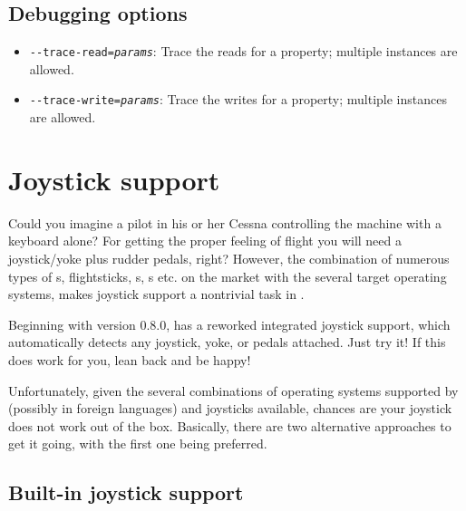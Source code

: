 \subsection{Debugging options}
\begin{itemize}
\item{\texttt{-$ $-trace-read={\it params}}}: Trace the reads for a property; multiple instances are allowed.
\item{\texttt{-$ $-trace-write={\it params}}}: Trace the writes for a property; multiple instances are allowed.
\end{itemize}



\section{Joystick support\label{joysticksupp}}
Could you imagine a pilot in his or her Cessna controlling the machine with
a keyboard alone? For getting the proper feeling of flight you will need a
joystick/yoke plus rudder pedals, right? However, the combination of
numerous types of s, flightsticks, s,
s etc. on the market with the several target operating systems,
makes joystick support a nontrivial task in \FlightGear{}$\!$.

Beginning with version 0.8.0, \FlightGear{} has a reworked integrated
joystick support, which automatically detects any joystick, yoke, or pedals
attached. Just try it! If this does work for you, lean back and be happy!

Unfortunately, given the several combinations of operating systems supported
by \FlightGear{} (possibly in foreign languages) and joysticks available,
chances are your joystick does not work out of the box. Basically, there are
two alternative approaches to get it going, with the first one being
preferred.


\subsection{Built-in joystick support\label{joystickbuiltin}}

